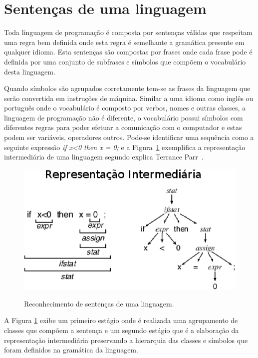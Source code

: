 \section{Sentenças de uma linguagem}
Toda linguagem de programação é composta por sentenças válidas que respeitam uma regra bem definida onde esta regra é semelhante a gramática presente em qualquer idioma.  Esta sentenças são compostas por frases onde cada frase pode é definida por uma conjunto de subfrases e símbolos que compõem o vocabulário desta linguagem. 

Quando símbolos são agrupados corretamente tem-se as frases da linguagem que serão convertida em instruções de máquina. Similar a uma idioma como inglês ou português onde o vocabulário é composto por verbos, nomes e outras classes, a linguagem de programação não é diferente, o vocabulário possui símbolos com diferentes regras para poder efetuar a comunicação com o computador e estas podem ser variáveis, operadores outros. Pode-se identificar uma sequência como a seguinte expressão \textit{if x<0 then x = 0;} e a Figura~\ref{fig:rep_intermediaria} exemplifica a representação intermediária de uma linguagem segundo explica Terrance Parr~\cite{Parr:2009:LIP:1823613}.

\begin{figure}[ht]
\centering
\includegraphics[scale=1]{Imagens/rep_intermediaria}
\label{fig:rep_intermediaria}
\caption{Reconhecimento de sentenças de uma linguagem.}
\end{figure}

A Figura \ref{fig:rep_intermediaria} exibe um primeiro estágio onde é realizada uma agrupamento de classes que compõem a sentença e um segundo estágio que é a elaboração da representação intermediária preservando a hierarquia das classes e símbolos que foram definidos na gramática da linguagem.



